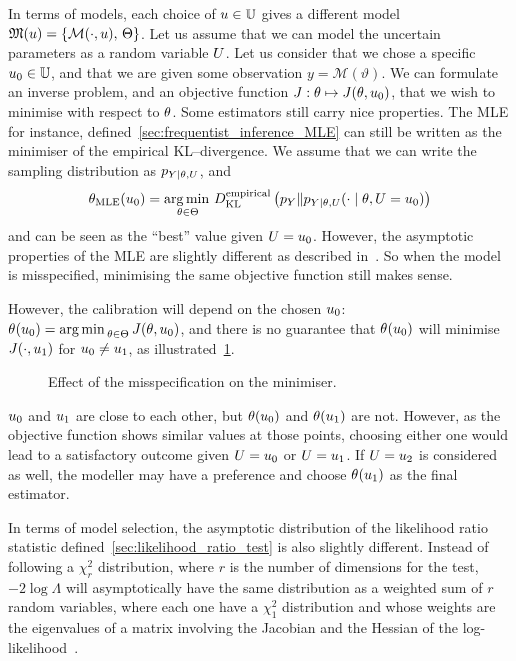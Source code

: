 \documentclass[../../Main_ManuscritThese.tex]{subfiles}
\newcommand\imgpath{/home/victor/acadwriting/Manuscrit/Text/Chapter2/img/}
\begin{document}

In terms of models, each choice of $\uu \in \Uspace$ gives a different
model $\mathfrak{M}(u) = \{\mathcal{M}(\cdot, u),\,\Kspace\}$. Let us
assume that we can model the uncertain parameters as a random variable
$\UU$.  Let us consider that we chose a specific $\uu_0 \in \Uspace$,
and that we are given some observation $y=\mathscr{M}(\vartheta)$. We can
formulate an inverse problem, and an objective function
$J:\kk \mapsto J(\kk,\uu_0)$, that we wish to minimise with respect to
$\kk$.  Some estimators still carry nice properties. The MLE for
instance, defined~\cref{sec:frequentist_inference_MLE} can still be
written as the minimiser of the empirical KL--divergence. We assume
that we can write the sampling distribution as $p_{Y \mid \KK, \UU}$,
and
\begin{equation}
  \estimtxt{\kk}{MLE}(\uu_0)=  \argmin_{\kk \in \Kspace}\DKL[empirical]{p_Y}{p_{Y \mid \kk, \UU}(\cdot \mid \kk, \UU=\uu_0)}
\end{equation}
and can be seen as the ``best'' value given $\UU=\uu_0$. However, the
asymptotic properties of the MLE are slightly different as described
in~\cite{white_maximum_1982}.  So when the model is misspecified,
minimising the same objective function still makes sense.

However, the calibration will depend on the chosen $\uu_0$:
$\estimtxt{\kk}{}(\uu_0) = \argmin_{\kk \in \Kspace} J(\kk,\uu_0)$, and
there is no guarantee that $\estimtxt{\kk}{}(\uu_0)$ will minimise
$J(\cdot, \uu_1)$ for $\uu_0 \neq \uu_1$, as
illustrated~\cref{fig:minimizer_misspecification}.

\begin{figure}[ht]
  \centering
  
  \caption{Effect of the misspecification on the minimiser.}
  \label{fig:minimizer_misspecification}
\end{figure}

$\uu_0$ and $\uu_1$ are close to each other, but ${\kk}(\uu_0)$ and
${\kk}(\uu_1)$ are not. However, as the objective function shows
similar values at those points, choosing either one would lead to a
satisfactory outcome given $\UU = \uu_0$ or $\UU=\uu_1$. If
$\UU = \uu_2$ is considered as well, the modeller may have a
preference and choose $\estimtxt{\kk}{}(\uu_1)$ as the final
estimator.

In terms of model selection, the asymptotic distribution of the
likelihood ratio statistic defined~\cref{sec:likelihood_ratio_test} is
also slightly different. Instead of following a $\chi^2_{r}$
distribution, where $r$ is the number of dimensions for the test,
$-2\log \Lambda$ will asymptotically have the same distribution as a
weighted sum of $r$ random variables, where each one have a $\chi^2_1$
distribution and whose weights are the eigenvalues of a matrix
involving the Jacobian and the Hessian of the
log-likelihood~\cite{kent_robust_1982}.
\end{document}
